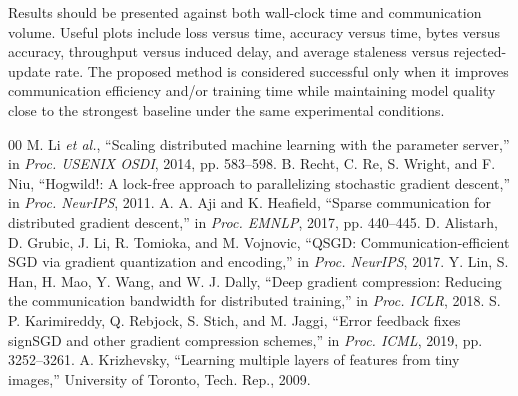 \documentclass[conference]{IEEEtran}
\begin{document}
Results should be presented against both wall-clock time and communication volume. Useful plots include loss versus time, accuracy versus time, bytes versus accuracy, throughput versus induced delay, and average staleness versus rejected-update rate. The proposed method is considered successful only when it improves communication efficiency and/or training time while maintaining model quality close to the strongest baseline under the same experimental conditions.

\begin{thebibliography}{00}
 M. Li \textit{et al.}, ``Scaling distributed machine learning with the parameter server,'' in \textit{Proc. USENIX OSDI}, 2014, pp. 583--598.
 B. Recht, C. Re, S. Wright, and F. Niu, ``Hogwild!: A lock-free approach to parallelizing stochastic gradient descent,'' in \textit{Proc. NeurIPS}, 2011.
 A. A. Aji and K. Heafield, ``Sparse communication for distributed gradient descent,'' in \textit{Proc. EMNLP}, 2017, pp. 440--445.
 D. Alistarh, D. Grubic, J. Li, R. Tomioka, and M. Vojnovic, ``QSGD: Communication-efficient SGD via gradient quantization and encoding,'' in \textit{Proc. NeurIPS}, 2017.
 Y. Lin, S. Han, H. Mao, Y. Wang, and W. J. Dally, ``Deep gradient compression: Reducing the communication bandwidth for distributed training,'' in \textit{Proc. ICLR}, 2018.
 S. P. Karimireddy, Q. Rebjock, S. Stich, and M. Jaggi, ``Error feedback fixes signSGD and other gradient compression schemes,'' in \textit{Proc. ICML}, 2019, pp. 3252--3261.
 A. Krizhevsky, ``Learning multiple layers of features from tiny images,'' University of Toronto, Tech. Rep., 2009.
\end{thebibliography}
\end{document}
